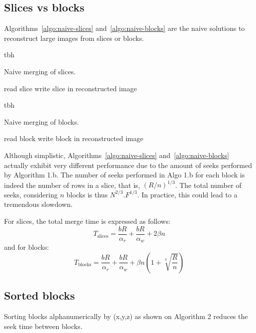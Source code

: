 \documentclass[10pt, conference, compsocconf]{IEEEtran}
\begin{document}
\subsection{Slices vs blocks}

Algorithms~\ref{algo:naive-slices} and~\ref{algo:naive-blocks} are the
naive solutions to reconstruct large images from slices or blocks.
\begin{algorithm}{tbh}
\caption{Naive merging of slices.}
\label{algo:naive-slices} 
\begin{algorithmic}
    \STATE read slice
    \STATE write slice in reconstructed image
  \ENDFOR      
\end{algorithmic}
\end{algorithm}

\begin{algorithm}{tbh}
\caption{Naive merging of blocks.}
\label{algo:naive-blocks}
\begin{algorithmic}
    \STATE read block
    \STATE write block in reconstructed image
  \ENDFOR 
\end{algorithmic}
\end{algorithm}

Although simplistic, Algorithms~\ref{algo:naive-slices}
and~\ref{algo:naive-blocks} actually exhibit very different
performance due to the amount of seeks performed by Algorithm 1.b. The
number of seeks performed in Algo 1.b for each block is indeed the
number of rows in a slice, that is, $(R/n)^{1/3}$. The total number of
seeks, considering $n$ blocks is thus $N^{2/3}.F^{1/3}$. In practice,
this could lead to a tremendous slowdown.

For slices, the total merge time is expressed as follows:
\begin{equation}
T_\mathrm{slices} = \frac{bR}{\alpha_r}+\frac{bR}{\alpha_w}+2\beta n
\end{equation}
and for blocks:
\begin{equation}
  T_\mathrm{blocks} = \frac{bR}{\alpha_r}+\frac{bR}{\alpha_w}+\beta n\left(1+\sqrt[3]{\frac{R}{n}}\right)
\end{equation}

\subsection{Sorted blocks}

Sorting blocks alphanumerically by (x,y,z) as shown on Algorithm 2 reduces the seek time
between blocks.
\end{document}
